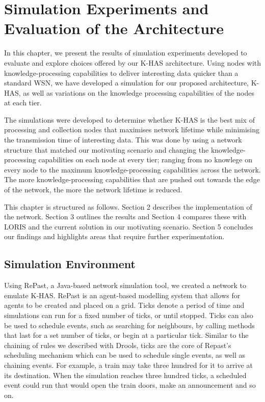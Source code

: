 \chapter{Simulation Experiments and Evaluation of the Architecture}
In this chapter, we present the results of simulation experiments developed to evaluate and explore choices offered by our K-HAS architecture. Using nodes with knowledge-processing capabilities to deliver interesting data quicker than a standard WSN, we have developed a simulation for our proposed architecture, K-HAS, as well as variations on the knowledge processing capabilities of the nodes at each tier.

The simulations were developed to determine whether K-HAS is the best mix of processing and collection nodes that maximises network lifetime while minimising the transmission time of interesting data. This was done by using a network structure that matched our motivating scenario and changing the knowledge-processing capabilities on each node at every tier; ranging from no knowlege on every node to the maximum knowledge-processing capabilities across the network. The more knowledge-processing capabilities that are pushed out towards the edge of the network, the more the network lifetime is reduced.

This chapter is structured as follows. Section 2 describes the implementation of the network. Section 3 outlines the results and Section 4 compares these with LORIS and the current solution in our motivating scenario. Section 5 concludes our findings and highlights areas that require further experimentation.

\section{Simulation Environment}

Using RePast, a Java-based network simulation tool, we created a network to emulate K-HAS. RePast is an agent-based modelling system that allows for agents to be created and placed on a grid. Ticks denote a period of time and simulations can run for a fixed number of ticks, or until stopped. Ticks can also be used to schedule events, such as searching for neighbours, by calling methods that last for a set number of ticks, or begin at a particular tick. Similar to the chaining of rules we described with Drools, ticks are the core of Repast's scheduling mechanism which can be used to schedule single events, as well as chaining events. For example, a train may take three hundred for it to arrive at its destination. When the simulation reaches three hundred ticks, a scheduled event could run that would open the train doors, make an announcement and so on.

